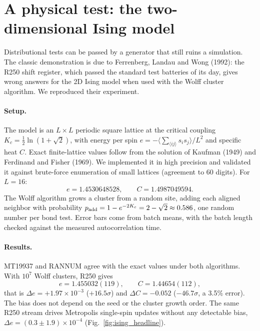 \documentclass[11pt]{article}
\begin{document}
\section{A physical test: the two-dimensional Ising model}

Distributional tests can be passed by a generator that still ruins a simulation. The classic demonstration is due to Ferrenberg, Landau and Wong (1992): the R250 shift register, which passed the standard test batteries of its day, gives wrong answers for the 2D Ising model when used with the Wolff cluster algorithm. We reproduced their experiment.

\paragraph{Setup.} The model is an $L\times L$ periodic square lattice at the critical coupling $K_c = \tfrac12\ln(1+\sqrt2)$, with energy per spin $e = -\langle\sum_{\langle ij\rangle}s_is_j\rangle/L^2$ and specific heat $C$. Exact finite-lattice values follow from the solution of Kaufman (1949) and Ferdinand and Fisher (1969). We implemented it in high precision and validated it against brute-force enumeration of small lattices (agreement to 60 digits). For $L = 16$:
\begin{equation}
e = 1.4530648528, \qquad C = 1.4987049594.
\end{equation}
The Wolff algorithm grows a cluster from a random site, adding each aligned neighbor with probability $p_{\rm add} = 1-e^{-2K_c} = 2-\sqrt2 \approx 0.586$, one random number per bond test. Error bars come from batch means, with the batch length checked against the measured autocorrelation time.

\paragraph{Results.} MT19937 and RANNUM agree with the exact values under both algorithms. With $10^7$ Wolff clusters, R250 gives
\begin{equation}
e = 1.455032(119), \qquad C = 1.44654(112),
\end{equation}
that is $\Delta e = +1.97\times10^{-3}$ ($+16.5\sigma$) and $\Delta C = -0.052$ ($-46.7\sigma$, a 3.5\% error). The bias does not depend on the seed or the cluster growth order. The same R250 stream drives Metropolis single-spin updates without any detectable bias, $\Delta e = (0.3 \pm 1.9)\times10^{-4}$ (Fig.~\ref{fig:ising_headline}).
\end{document}

